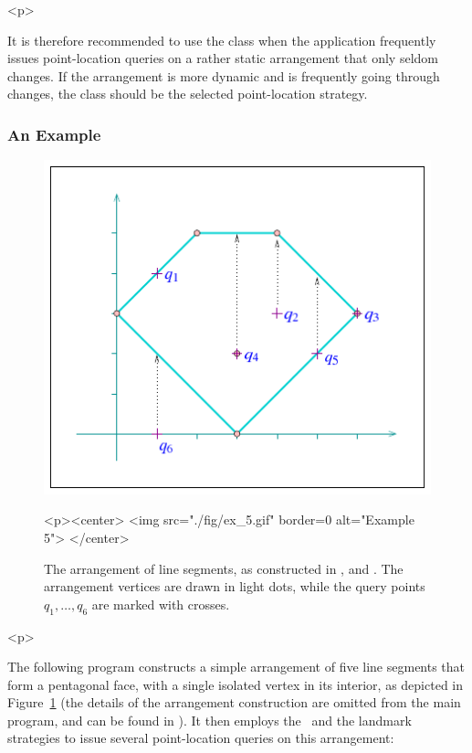 \begin{ccHtmlOnly}<p>\end{ccHtmlOnly}
It is therefore recommended to use the
 class when the application
frequently issues point-location queries on a rather static
arrangement that only seldom changes. If the arrangement is more
dynamic and is frequently going through changes, the
 class should be the
selected point-location strategy.

\subsubsection{An Example}
\label{arr_sssec:pl_ex}
%
\begin{figure}[!htp]
\begin{ccTexOnly}
  \begin{center}
  \includegraphics{Arrangement_2/fig/ex_5}
  \end{center}
\end{ccTexOnly}
\begin{ccHtmlOnly}
  <p><center>
  <img src="./fig/ex_5.gif" border=0 alt="Example 5">
  </center>
\end{ccHtmlOnly}
\caption{The arrangement of line segments, as constructed in
,  and . The
arrangement vertices are drawn in light dots, while the query
points $q_1, \ldots, q_6$ are marked with crosses.}
\label{arr_fig:ex_5}
\end{figure}

\begin{ccHtmlOnly}<p>\end{ccHtmlOnly}
The following program constructs a simple arrangement of five line
segments that form a pentagonal face, with a single isolated
vertex in its interior, as depicted in Figure~\ref{arr_fig:ex_5}
(the details of the arrangement construction are omitted from the
main program, and can be found in ).
It then employs the \naive\ and the landmark strategies to issue
several point-location queries on this arrangement:

